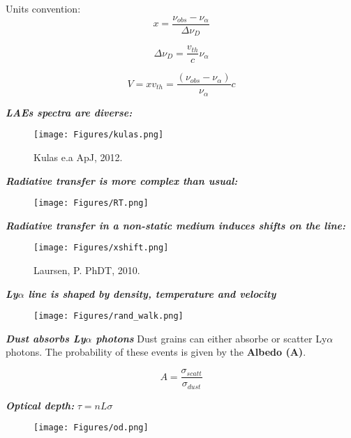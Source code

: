 \documentclass{beamer}
\begin{document}
\begin{frame}{Units convention:}
\[
x = \dfrac{\nu_{obs} - \nu_{\alpha}}{\Delta \nu_{D}} 
\]

\[
\Delta \nu_{D} = \dfrac{v_{th}}{c}\nu_{\alpha}
\]

\[
V = x v_{th} = \dfrac{(\nu_{obs} - \nu_{\alpha})}{\nu_{\alpha}} c
\]

\end{frame}

\begin{frame}{\textit{\textbf{LAEs spectra are diverse:}}}
\begin{figure}
\texttt{[image: Figures/kulas.png]}
\caption*{Kulas e.a ApJ, 2012.}
\end{figure}
\end{frame}

\begin{frame}{\textit{\textbf{Radiative transfer is more complex than usual:}}}
\begin{figure}
\texttt{[image: Figures/RT.png]}
\end{figure}
\end{frame}

\begin{frame}{\textit{\textbf{Radiative transfer in a non-static medium induces	 shifts on the line:}}}
\begin{figure}
\texttt{[image: Figures/xshift.png]}
\caption*{Laursen, P. PhDT, 2010.}
\end{figure}
\end{frame}


\begin{frame}{\textit{\textbf{Ly$\alpha$ line is shaped by density, temperature and velocity}}}
\begin{figure}
\texttt{[image: Figures/rand\_walk.png]}
\end{figure}
\end{frame}

\begin{frame}{\textit{\textbf{Dust absorbs Ly$\alpha$ photons}}}
Dust grains can either absorbe or scatter Ly$\alpha$ photons. The probability
of these events is given by the \textbf{Albedo (A)}.

\[   
A = \dfrac{\sigma_{scatt}}{\sigma_{dust}}
\]

 
\end{frame}

\begin{frame}{\textit{\textbf{Optical depth:}}}
\LARGE{$\tau = nL\sigma$}
\begin{figure}
\texttt{[image: Figures/od.png]}
\end{figure} 
\end{frame}
\end{document}

